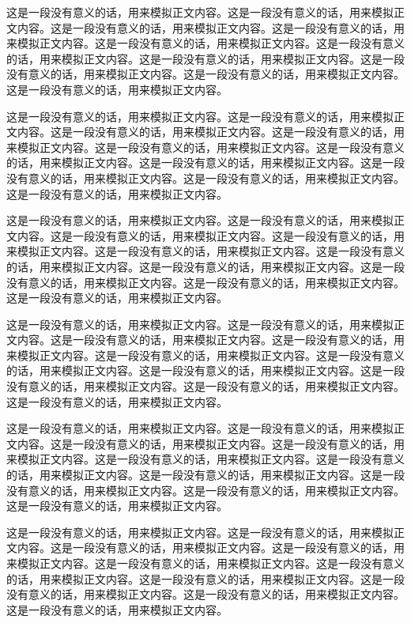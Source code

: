 
这是一段没有意义的话，用来模拟正文内容。这是一段没有意义的话，用来模拟正文内容。这是一段没有意义的话，用来模拟正文内容。这是一段没有意义的话，用来模拟正文内容。这是一段没有意义的话，用来模拟正文内容。这是一段没有意义的话，用来模拟正文内容。这是一段没有意义的话，用来模拟正文内容。这是一段没有意义的话，用来模拟正文内容。这是一段没有意义的话，用来模拟正文内容。这是一段没有意义的话，用来模拟正文内容。


这是一段没有意义的话，用来模拟正文内容。这是一段没有意义的话，用来模拟正文内容。这是一段没有意义的话，用来模拟正文内容。这是一段没有意义的话，用来模拟正文内容。这是一段没有意义的话，用来模拟正文内容。这是一段没有意义的话，用来模拟正文内容。这是一段没有意义的话，用来模拟正文内容。这是一段没有意义的话，用来模拟正文内容。这是一段没有意义的话，用来模拟正文内容。这是一段没有意义的话，用来模拟正文内容。


这是一段没有意义的话，用来模拟正文内容。这是一段没有意义的话，用来模拟正文内容。这是一段没有意义的话，用来模拟正文内容。这是一段没有意义的话，用来模拟正文内容。这是一段没有意义的话，用来模拟正文内容。这是一段没有意义的话，用来模拟正文内容。这是一段没有意义的话，用来模拟正文内容。这是一段没有意义的话，用来模拟正文内容。这是一段没有意义的话，用来模拟正文内容。这是一段没有意义的话，用来模拟正文内容。


这是一段没有意义的话，用来模拟正文内容。这是一段没有意义的话，用来模拟正文内容。这是一段没有意义的话，用来模拟正文内容。这是一段没有意义的话，用来模拟正文内容。这是一段没有意义的话，用来模拟正文内容。这是一段没有意义的话，用来模拟正文内容。这是一段没有意义的话，用来模拟正文内容。这是一段没有意义的话，用来模拟正文内容。这是一段没有意义的话，用来模拟正文内容。这是一段没有意义的话，用来模拟正文内容。


这是一段没有意义的话，用来模拟正文内容。这是一段没有意义的话，用来模拟正文内容。这是一段没有意义的话，用来模拟正文内容。这是一段没有意义的话，用来模拟正文内容。这是一段没有意义的话，用来模拟正文内容。这是一段没有意义的话，用来模拟正文内容。这是一段没有意义的话，用来模拟正文内容。这是一段没有意义的话，用来模拟正文内容。这是一段没有意义的话，用来模拟正文内容。这是一段没有意义的话，用来模拟正文内容。


这是一段没有意义的话，用来模拟正文内容。这是一段没有意义的话，用来模拟正文内容。这是一段没有意义的话，用来模拟正文内容。这是一段没有意义的话，用来模拟正文内容。这是一段没有意义的话，用来模拟正文内容。这是一段没有意义的话，用来模拟正文内容。这是一段没有意义的话，用来模拟正文内容。这是一段没有意义的话，用来模拟正文内容。这是一段没有意义的话，用来模拟正文内容。这是一段没有意义的话，用来模拟正文内容。
